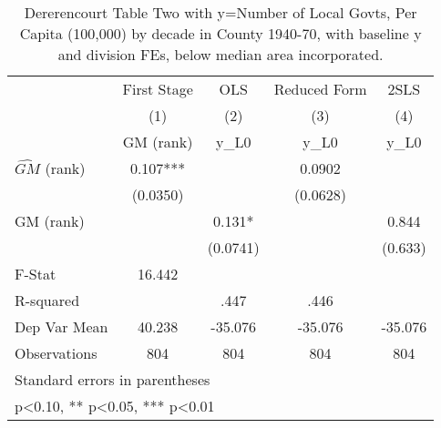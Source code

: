 \begin{table}[htbp]\centering
\def\sym#1{\ifmmode^{#1}\else\(^{#1}\)\fi}
\caption{Dererencourt Table Two with y=Number of Local Govts, Per Capita (100,000) by decade in County 1940-70, with baseline y and division FEs, below median area incorporated.}
\begin{tabular}{l*{4}{c}}
\toprule
                    & First Stage   &         OLS   &Reduced Form   &        2SLS   \\
                    &\multicolumn{1}{c}{(1)}&\multicolumn{1}{c}{(2)}&\multicolumn{1}{c}{(3)}&\multicolumn{1}{c}{(4)}\\
                    &\multicolumn{1}{c}{GM  (rank)}&\multicolumn{1}{c}{y\_L0}&\multicolumn{1}{c}{y\_L0}&\multicolumn{1}{c}{y\_L0}\\
\midrule
$\hat{GM}$ (rank)   &       0.107***&               &      0.0902   &               \\
                    &    (0.0350)   &               &    (0.0628)   &               \\
\addlinespace
GM  (rank)          &               &       0.131*  &               &       0.844   \\
                    &               &    (0.0741)   &               &     (0.633)   \\
\midrule
F-Stat              &      16.442   &               &               &               \\
R-squared           &               &        .447   &        .446   &               \\
Dep Var Mean        &      40.238   &     -35.076   &     -35.076   &     -35.076   \\
Observations        &         804   &         804   &         804   &         804   \\
\bottomrule
\multicolumn{5}{l}{\footnotesize Standard errors in parentheses}\\
\multicolumn{5}{l}{\footnotesize * p<0.10, ** p<0.05, *** p<0.01}\\
\end{tabular}
\end{table}
